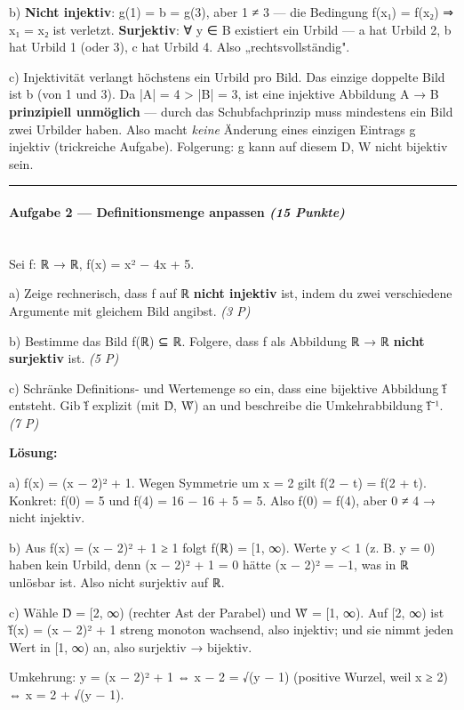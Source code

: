 \documentclass[11pt, a4paper]{article}
\begin{document}
b) \textbf{Nicht injektiv}: g(1) = b = g(3), aber 1 ≠ 3 — die Bedingung f(x₁) = f(x₂) ⇒ x₁ = x₂ ist verletzt. \textbf{Surjektiv}: ∀ y ∈ B existiert ein Urbild — a hat Urbild 2, b hat Urbild 1 (oder 3), c hat Urbild 4. Also „rechtsvollständig".


c) Injektivität verlangt höchstens ein Urbild pro Bild. Das einzige doppelte Bild ist b (von 1 und 3). Da |A| = 4 > |B| = 3, ist eine injektive Abbildung A → B \textbf{prinzipiell unmöglich} — durch das Schubfachprinzip muss mindestens ein Bild zwei Urbilder haben. Also macht \textit{keine} Änderung eines einzigen Eintrags g injektiv (trickreiche Aufgabe). Folgerung: g kann auf diesem D, W nicht bijektiv sein.



\noindent\textcolor{rulegray}{\rule{\linewidth}{0.4pt}}


\paragraph{Aufgabe 2 — Definitionsmenge anpassen \textit{(15 Punkte)}}\mbox{}\\[2pt]

Sei f: ℝ → ℝ, f(x) = x² − 4x + 5.


a) Zeige rechnerisch, dass f auf ℝ \textbf{nicht injektiv} ist, indem du zwei verschiedene Argumente mit gleichem Bild angibst. \textit{(3 P)}


b) Bestimme das Bild f(ℝ) ⊆ ℝ. Folgere, dass f als Abbildung ℝ → ℝ \textbf{nicht surjektiv} ist. \textit{(5 P)}


c) Schränke Definitions- und Wertemenge so ein, dass eine bijektive Abbildung f̃ entsteht. Gib f̃ explizit (mit D̃, W̃) an und beschreibe die Umkehrabbildung f̃⁻¹. \textit{(7 P)}


\textbf{Lösung:}


a) f(x) = (x − 2)² + 1. Wegen Symmetrie um x = 2 gilt f(2 − t) = f(2 + t). Konkret: f(0) = 5 und f(4) = 16 − 16 + 5 = 5. Also f(0) = f(4), aber 0 ≠ 4 → nicht injektiv.


b) Aus f(x) = (x − 2)² + 1 ≥ 1 folgt f(ℝ) = [1, ∞). Werte y < 1 (z. B. y = 0) haben kein Urbild, denn (x − 2)² + 1 = 0 hätte (x − 2)² = −1, was in ℝ unlösbar ist. Also nicht surjektiv auf ℝ.


c) Wähle D̃ = [2, ∞) (rechter Ast der Parabel) und W̃ = [1, ∞). Auf [2, ∞) ist f̃(x) = (x − 2)² + 1 streng monoton wachsend, also injektiv; und sie nimmt jeden Wert in [1, ∞) an, also surjektiv → bijektiv.


Umkehrung: y = (x − 2)² + 1 ⇔ x − 2 = √(y − 1) (positive Wurzel, weil x ≥ 2) ⇔ x = 2 + √(y − 1).
\end{document}
